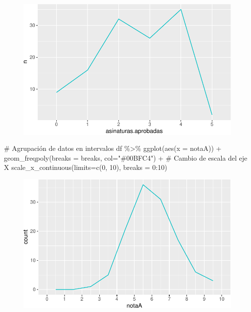 \documentclass[
  a4paper,
]{scrreport}
\newenvironment{Shaded}{\begin{snugshade}}{\end{snugshade}}
\newcommand{\AttributeTok}[1]{\textcolor[rgb]{0.40,0.45,0.13}{#1}}
\newcommand{\CommentTok}[1]{\textcolor[rgb]{0.37,0.37,0.37}{#1}}
\newcommand{\DecValTok}[1]{\textcolor[rgb]{0.68,0.00,0.00}{#1}}
\newcommand{\FunctionTok}[1]{\textcolor[rgb]{0.28,0.35,0.67}{#1}}
\newcommand{\NormalTok}[1]{\textcolor[rgb]{0.00,0.23,0.31}{#1}}
\newcommand{\SpecialCharTok}[1]{\textcolor[rgb]{0.37,0.37,0.37}{#1}}
\newcommand{\StringTok}[1]{\textcolor[rgb]{0.13,0.47,0.30}{#1}}
\theoremstyle{definition}
\theoremstyle{definition}
\theoremstyle{remark}
\begin{document}
\begin{figure}[H]

{\centering \includegraphics{08-analisis-estadisticos_files/figure-pdf/unnamed-chunk-13-1.pdf}

}

\end{figure}

\begin{Shaded}
\begin{Highlighting}[]
\CommentTok{\# Agrupación de datos en intervalos}
\NormalTok{df }\SpecialCharTok{\%\textgreater{}\%} \FunctionTok{ggplot}\NormalTok{(}\FunctionTok{aes}\NormalTok{(}\AttributeTok{x =}\NormalTok{ notaA)) }\SpecialCharTok{+} 
  \FunctionTok{geom\_freqpoly}\NormalTok{(}\AttributeTok{breaks =}\NormalTok{ breaks, }\AttributeTok{col=}\StringTok{"\#00BFC4"}\NormalTok{) }\SpecialCharTok{+} 
  \CommentTok{\# Cambio de escala del eje X}
  \FunctionTok{scale\_x\_continuous}\NormalTok{(}\AttributeTok{limits=}\FunctionTok{c}\NormalTok{(}\DecValTok{0}\NormalTok{, }\DecValTok{10}\NormalTok{), }\AttributeTok{breaks =} \DecValTok{0}\SpecialCharTok{:}\DecValTok{10}\NormalTok{) }
\end{Highlighting}
\end{Shaded}

\begin{figure}[H]

{\centering \includegraphics{08-analisis-estadisticos_files/figure-pdf/unnamed-chunk-14-1.pdf}

}

\end{figure}
\end{document}
